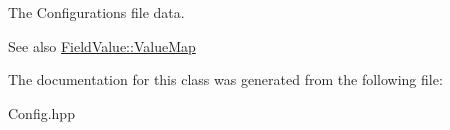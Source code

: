 The Configuration\textquotesingle{}s file data. 

\begin{DoxySeeAlso}{See also}
\mbox{\hyperlink{classZiApi_1_1FieldValue_ad8dd32464e75289185e2d8260cb3672d}{Field\+Value\+::\+Value\+Map}} 
\end{DoxySeeAlso}


The documentation for this class was generated from the following file\+:\begin{DoxyCompactItemize}
\item 
Config.\+hpp\end{DoxyCompactItemize}
